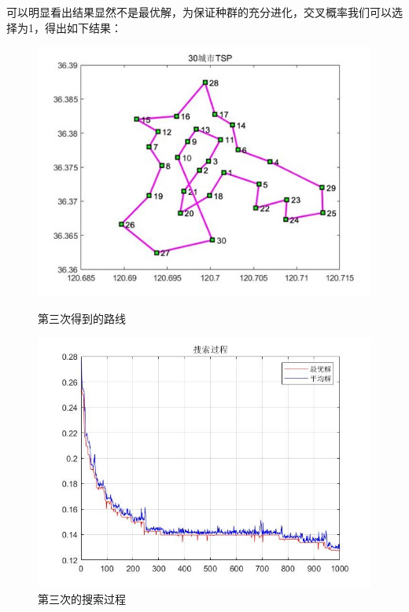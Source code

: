 \documentclass{article}
\begin{document}
可以明显看出结果显然不是最优解，为保证种群的充分进化，交叉概率我们可以选择为1，得出如下结果： 

\vspace{0.5ex}
\begin{figure}[hbt]
	\begin{minipage}[t]{0.5\textwidth}
		\centering
		\includegraphics[scale=1]{7.5.jpg}
		\caption{第三次得到的路线}
	\end{minipage}
	\qquad
	\begin{minipage}[t]{0.5\textwidth}
		\centering
		\includegraphics[scale=0.45]{7.6.jpg}
		\caption{第三次的搜索过程}
	\end{minipage}
\end{figure}
\vspace{0.5ex}
\end{document}
